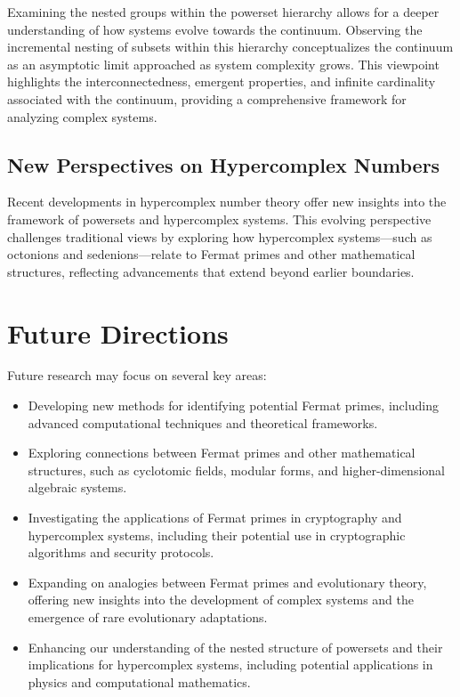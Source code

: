\documentclass[12pt]{article}
\begin{document}
Examining the nested groups within the powerset hierarchy allows for a deeper understanding of how systems evolve towards the continuum. Observing the incremental nesting of subsets within this hierarchy conceptualizes the continuum as an asymptotic limit approached as system complexity grows. This viewpoint highlights the interconnectedness, emergent properties, and infinite cardinality associated with the continuum, providing a comprehensive framework for analyzing complex systems.

\subsection{New Perspectives on Hypercomplex Numbers}

Recent developments in hypercomplex number theory offer new insights into the framework of powersets and hypercomplex systems. This evolving perspective challenges traditional views by exploring how hypercomplex systems—such as octonions and sedenions—relate to Fermat primes and other mathematical structures, reflecting advancements that extend beyond earlier boundaries.

\section{Future Directions}

Future research may focus on several key areas:

\begin{itemize}
    \item Developing new methods for identifying potential Fermat primes, including advanced computational techniques and theoretical frameworks.
    \item Exploring connections between Fermat primes and other mathematical structures, such as cyclotomic fields, modular forms, and higher-dimensional algebraic systems.
    \item Investigating the applications of Fermat primes in cryptography and hypercomplex systems, including their potential use in cryptographic algorithms and security protocols.
    \item Expanding on analogies between Fermat primes and evolutionary theory, offering new insights into the development of complex systems and the emergence of rare evolutionary adaptations.
    \item Enhancing our understanding of the nested structure of powersets and their implications for hypercomplex systems, including potential applications in physics and computational mathematics.
\end{itemize}
\end{document}
